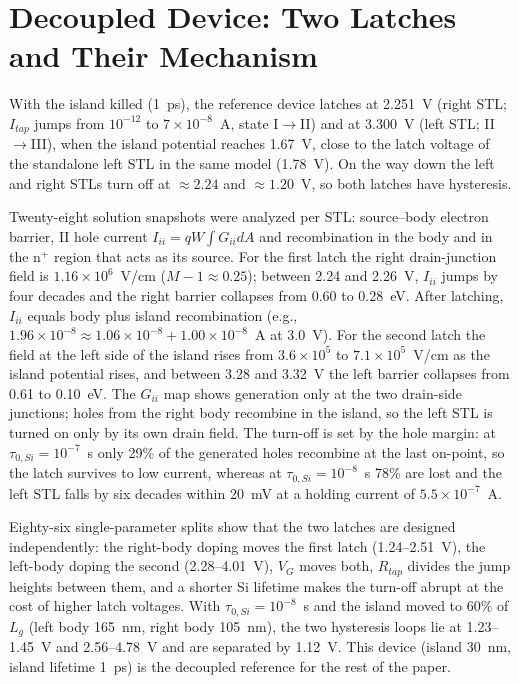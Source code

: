 \documentclass[journal]{IEEEtran}
\begin{document}
\section{Decoupled Device: Two Latches and Their Mechanism}
With the island killed (1~ps), the reference device latches at 2.251~V (right STL; $I_{tap}$ jumps from $10^{-12}$ to $7\times10^{-8}$~A, state I$\rightarrow$II) and at 3.300~V (left STL; II$\rightarrow$III), when the island potential reaches 1.67~V, close to the latch voltage of the standalone left STL in the same model (1.78~V). On the way down the left and right STLs turn off at $\approx2.24$ and $\approx1.20$~V, so both latches have hysteresis.

Twenty-eight solution snapshots were analyzed per STL: source--body electron barrier, II hole current $I_{ii}=qW\!\int G_{ii}dA$ and recombination in the body and in the n$^+$ region that acts as its source. For the first latch the right drain-junction field is $1.16\times10^6$~V/cm ($M-1\approx0.25$); between 2.24 and 2.26~V, $I_{ii}$ jumps by four decades and the right barrier collapses from 0.60 to 0.28~eV. After latching, $I_{ii}$ equals body plus island recombination (e.g., $1.96\times10^{-8}\approx1.06\times10^{-8}+1.00\times10^{-8}$~A at 3.0~V). For the second latch the field at the left side of the island rises from $3.6\times10^5$ to $7.1\times10^5$~V/cm as the island potential rises, and between 3.28 and 3.32~V the left barrier collapses from 0.61 to 0.10~eV. The $G_{ii}$ map shows generation only at the two drain-side junctions; holes from the right body recombine in the island, so the left STL is turned on only by its own drain field. The turn-off is set by the hole margin: at $\tau_{0,Si}=10^{-7}$~s only 29\% of the generated holes recombine at the last on-point, so the latch survives to low current, whereas at $\tau_{0,Si}=10^{-8}$~s 78\% are lost and the left STL falls by six decades within 20~mV at a holding current of $5.5\times10^{-7}$~A.

Eighty-six single-parameter splits show that the two latches are designed independently: the right-body doping moves the first latch (1.24--2.51~V), the left-body doping the second (2.28--4.01~V), $V_G$ moves both, $R_{tap}$ divides the jump heights between them, and a shorter Si lifetime makes the turn-off abrupt at the cost of higher latch voltages. With $\tau_{0,Si}=10^{-8}$~s and the island moved to 60\% of $L_g$ (left body 165~nm, right body 105~nm), the two hysteresis loops lie at 1.23--1.45~V and 2.56--4.78~V and are separated by 1.12~V. This device (island 30~nm, island lifetime 1~ps) is the decoupled reference for the rest of the paper.
\end{document}
